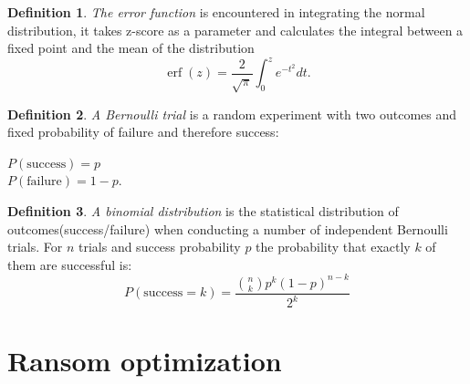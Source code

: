 \documentclass[11pt, a4paper]{article}
\theoremstyle{definition}
\newtheorem{definition}{Definition}
\begin{document}
		\begin{definition}
			\label{def:err}
			\emph{The error function} is encountered in integrating the normal distribution, it takes z-score as a parameter and calculates the integral between a fixed point and the mean of the distribution
			$$\operatorname{erf}(z)=\dfrac{2}{\sqrt{\pi}}\int_{0}^{z}e^{-t^{2}}dt.$$
		\end{definition}
	
		\begin{definition}
			\label{def:Bernoulli_trial}
			\emph{A Bernoulli trial} is a random experiment with two outcomes and fixed probability of failure and therefore success:
			\begin{center}
			$P(\text{success})=p$\\
			$P(\text{failure})=1-p.$
			\end{center}
		\end{definition}
	
		\begin{definition}
			\label{def:Binomial_distribution}
			\emph{A binomial distribution} is the statistical distribution of outcomes(success/failure) when conducting a number of independent Bernoulli trials.
			For $n$ trials and success probability $p$ the probability that exactly $k$ of them are successful is:
			$$
			P(\text{success} = k) = \frac{\binom{n}{k}p^{k}(1-p)^{n-k}}{2^k}
			$$
		\end{definition}
	\section{Ransom optimization}
\end{document}
